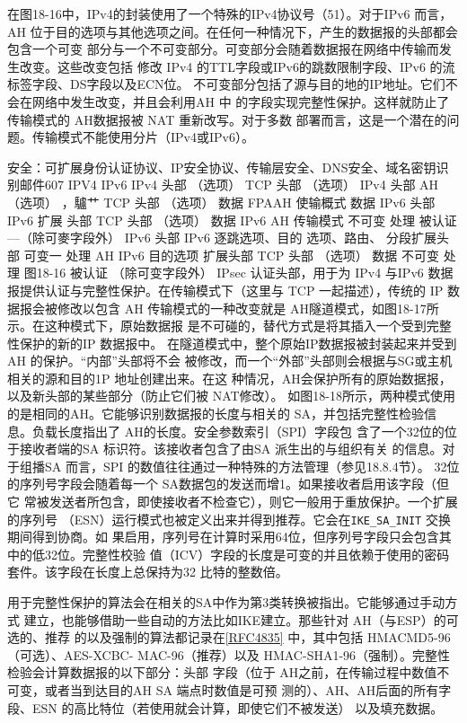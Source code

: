 在图18-16中，IPv4的封装使用了一个特殊的IPv4协议号（51）。对于IPv6 而言，AH
位于目的选项与其他选项之间。在任何一种情况下，产生的数据报的头部都会包含一个可变
部分与一个不可变部分。可变部分会随着数据报在网络中传输而发生改变。这些改变包括
修改 IPv4 的TTL字段或IPv6的跳数限制字段、IPv6 的流标签字段、DS字段以及ECN位。
不可变部分包括了源与目的地的IP地址。它们不会在网络中发生改变，并且会利用AH 中
的字段实现完整性保护。这样就防止了传输模式的 AH数据报被 NAT 重新改写。对于多数
部署而言，这是一个潜在的问题。传输模式不能使用分片（IPv4或IPv6）。

安全：可扩展身份认证协议、IP安全协议、传输层安全、DNS安全、域名密钥识别邮件607
IPV4
IPv6
IPv4
头部
（选项）
TCP
头部
（选项）
IPv4
头部
AH
（选项）
，驢艹
TCP
头部
（选项）
数据
FPAAH 使输概式
数据
IPv6
头部
IPv6
扩展
头部
TCP
头部
（选项）
数据
IPv6 AH 传输模式
不可变
处理
被认证
—（除可麥字段外）
IPv6
头部
IPv6
逐跳选项、目的
选项、路由、
分段扩展头部
可变一
处理
AH
IPv6
目的选项
扩展头部
TCP
头部
（选项）
数据
不可变
处理
图18-16
被认证
（除可变字段外）
IPsec 认证头部，用于为 IPv4 与IPv6 数据报提供认证与完整性保护。在传输模式下（这里与
TCP 一起描述），传统的 IP 数据报会被修改以包含 AH
传输模式的一种改变就是 AH隧道模式，如图18-17所示。在这种模式下，原始数据报
是不可碰的，替代方式是将其插入一个受到完整性保护的新的IP 数据报中。
在隧道模式中，整个原始IP数据报被封装起来并受到 AH 的保护。“内部”头部将不会
被修改，而一个“外部”头部则会根据与SG或主机相关的源和目的1P 地址创建出来。在这
种情况，AH会保护所有的原始数据报，以及新头部的某些部分（防止它们被 NAT修改）。
如图18-18所示，两种模式使用的是相同的AH。它能够识别数据报的长度与相关的
SA，并包括完整性检验信息。负载长度指出了 AH的长度。安全参数索引（SPI）字段包
含了一个32位的位于接收者端的SA 标识符。该接收者包含了由SA 派生出的与组织有关
的信息。对于组播SA 而言，SPI 的数值往往通过一种特殊的方法管理（参见18.8.4节）。
32位的序列号字段会随着每一个 SA数据包的发送而增1。如果接收者启用该字段（但它
常被发送者所包含，即使接收者不检查它），则它一般用于重放保护。一个扩展的序列号
（ESN）运行模式也被定义出来并得到推荐。它会在\verb|IKE_SA_INIT| 交换期间得到协商。如
果启用，序列号在计算时采用64位，但序列号字段只会包含其中的低32位。完整性校验
值（ICV）字段的长度是可变的并且依赖于使用的密码套件。该字段在长度上总保持为32
比特的整数倍。

用于完整性保护的算法会在相关的SA中作为第3类转换被指出。它能够通过手动方式
建立，也能够借助一些自动的方法比如IKE建立。那些针对 AH（与ESP）的可选的、推荐
的以及强制的算法都记录在\href{https://www.rfc-editor.org/rfc/rfc4835}{[RFC4835]} 中，其中包括 HMACMD5-96（可选）、AES-XCBC-
MAC-96（推荐）以及 HMAC-SHA1-96（强制）。完整性检验会计算数据报的以下部分：头部
字段（位于 AH之前，在传输过程中数值不可变，或者当到达目的AH SA 端点时数值是可预
测的）、AH、AH后面的所有字段、ESN 的高比特位（若使用就会计算，即使它们不被发送）
以及填充数据。

